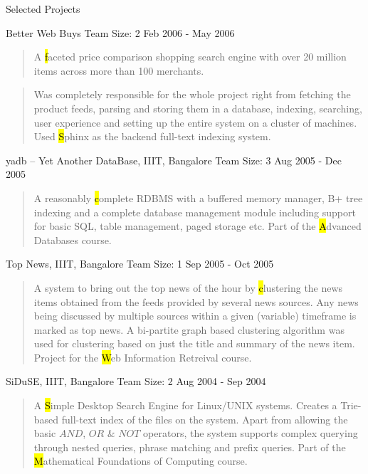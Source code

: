 \documentclass{resume}
\newcommand{\teamsize}{\hfill\sc\footnotesize Team Size: }
\begin{document}
\begin{category}{Selected Projects}{}
    \item {\topic Better Web Buys}
        {\teamsize 2}
        {\period Feb 2006 - May 2006}
        \begin{quote}
            A {\hl faceted price comparison shopping search engine} with over
            20 million items across more than 100 merchants.
        \end{quote}
        \begin{quote}
            Was completely responsible for the whole project right from
            fetching the product feeds, parsing and storing them in a database,
            indexing, searching, user experience and setting up the entire
            system on a cluster of machines. Used {\hl Sphinx} as the backend
            full-text indexing system.
        \end{quote}

    \item {\topic yadb -- Yet Another DataBase,} IIIT, Bangalore
        {\teamsize 3}
        {\period Aug 2005 - Dec 2005}
        \begin{quote}
            A reasonably {\hl complete RDBMS} with a buffered memory manager,
            B+ tree indexing and a complete database management module
            including support for basic SQL, table management, paged storage
            etc. Part of the {\hl Advanced Databases} course.
        \end{quote}

    \item {\topic Top News,} IIIT, Bangalore
        {\teamsize 1}
        {\period Sep 2005 - Oct 2005}
        \begin{quote}
            A system to bring out the top news of the hour by {\hl clustering
            the news items} obtained from the feeds provided by several news
            sources. Any news being discussed by multiple sources within a
            given (variable) timeframe is marked as top news. A bi-partite
            graph based clustering algorithm was used for clustering based on
            just the title and summary of the news item. Project for the {\hl
            Web Information Retreival} course.
        \end{quote}

    \item {\topic SiDuSE,} IIIT, Bangalore
        {\teamsize 2}
        {\period Aug 2004 - Sep 2004}
        \begin{quote}
            A {\hl Simple Desktop Search Engine} for Linux/UNIX systems.
            Creates a Trie-based full-text index of the files on the system.
            Apart from allowing the basic $AND$, $OR$ \& $NOT$ operators, the
            system supports complex querying through nested queries, phrase
            matching and prefix queries. Part of the {\hl Mathematical
            Foundations of Computing} course.
        \end{quote}


\end{category}
\end{document}
